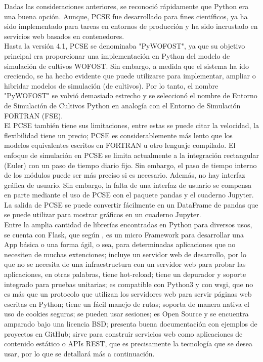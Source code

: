 Dadas las consideraciones anteriores, se reconoció rápidamente que Python era una buena opción. Aunque, PCSE fue desarrollado para fines científicos, ya ha sido implementado para tareas en entornos de producción y ha sido incrustado en servicios web basados en contenedores.\\

Hasta la versión 4.1, PCSE se denominaba "PyWOFOST", ya que su objetivo principal era proporcionar una implementación en Python del modelo de simulación de cultivos WOFOST. Sin embargo, a medida que el sistema ha ido creciendo, se ha hecho evidente que puede utilizarse para implementar, ampliar o hibridar modelos de simulación (de cultivos). Por lo tanto, el nombre "PyWOFOST" se volvió demasiado estrecho y se seleccionó el nombre de Entorno de Simulación de Cultivos Python en analogía con el Entorno de Simulación FORTRAN (FSE).\\

El PCSE también tiene sus limitaciones, entre estas se puede citar la velocidad, la flexibilidad tiene un precio; PCSE es considerablemente más lento que los modelos equivalentes escritos en FORTRAN u otro lenguaje compilado. El enfoque de simulación en PCSE se limita actualmente a la integración rectangular (Euler) con un paso de tiempo diario fijo. Sin embargo, el paso de tiempo interno de los módulos puede ser más preciso si es necesario. Además, no hay interfaz gráfica de usuario. Sin embargo, la falta de una interfaz de usuario se compensa en parte mediante el uso de PCSE con el paquete pandas y el cuaderno Jupyter. La salida de PCSE se puede convertir fácilmente en un DataFrame de pandas que se puede utilizar para mostrar gráficos en un cuaderno Jupyter.\\

Entre la amplia cantidad de librerías encontradas en Python para diversos usos, se cuenta con Flask, que según  \parencite{flask_que_2017}, es un micro Framework para desarrollar una App básica o una forma ágil, o sea, para determinadas aplicaciones que no necesiten de muchas extenciones; incluye un servidor web de desarrollo, por lo que no se necesita de una infraestructura con un servidor web para probar las aplicaciones, en otras palabras, tiene hot-reload; tiene un depurador y soporte integrado para pruebas unitarias; es compatible con Python3 y con wsgi, que no es más que un protocolo que utilizan los servidores web para servir páginas web escritas en Python; tiene un fácil manejo de rutas; soporta de manera nativa el uso de cookies seguras; se pueden usar sesiones; es Open Source y se encuentra amparado bajo una licencia BSD; presenta buena documentación con ejemplos de proyectos en GitHub; sirve para construir servicios web como aplicaciones de contenido estático o APIs REST, que es precisamente la tecnología que se desea usar, por lo que se detallará más a continuación.\\

